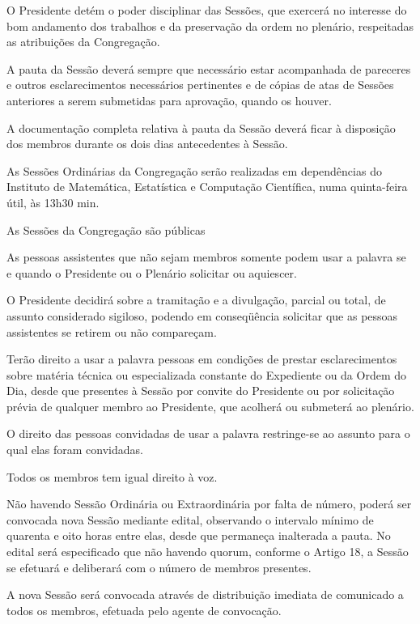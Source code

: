 \documentclass{documento}
\begin{document}
\artigo O Presidente detém o poder disciplinar das Sessões, que exercerá no interesse do bom andamento dos trabalhos e da preservação da ordem no plenário, respeitadas as atribuições da Congregação.

\artigo A pauta da Sessão deverá sempre que necessário estar acompanhada de pareceres e outros esclarecimentos necessários pertinentes e de cópias de atas de Sessões anteriores a serem submetidas para aprovação, quando os houver.

\paragrafo A documentação completa relativa à pauta da Sessão deverá ficar à disposição dos membros durante os dois dias antecedentes à Sessão.

\paragrafo As Sessões Ordinárias da Congregação serão realizadas em dependências do Instituto de Matemática, Estatística e Computação Científica, numa quinta-feira útil, às 13h30 min. 

\artigo As Sessões da Congregação são públicas

\paragrafo As pessoas assistentes que não sejam membros somente podem usar a palavra se e quando o Presidente ou o Plenário solicitar ou aquiescer.

\paragrafo O Presidente decidirá sobre a tramitação e a divulgação, parcial ou total, de assunto considerado sigiloso, podendo em conseqüência solicitar que as pessoas assistentes se retirem ou não compareçam.

\paragrafo Terão direito a usar a palavra pessoas em condições de prestar esclarecimentos sobre matéria técnica ou especializada constante do Expediente ou da Ordem do Dia, desde que presentes à Sessão por convite do Presidente ou por solicitação prévia de qualquer membro ao Presidente, que acolherá ou submeterá ao plenário.

\paragrafo O direito das pessoas convidadas de usar a palavra restringe-se ao assunto para o qual elas foram convidadas.

\paragrafo Todos os membros tem igual direito à voz.

\artigo Não havendo Sessão Ordinária ou Extraordinária por falta de número, poderá ser convocada nova Sessão mediante edital, observando o intervalo mínimo de quarenta e oito horas entre elas, desde que permaneça inalterada a pauta. No edital será especificado que não havendo quorum, conforme o Artigo 18, a Sessão se efetuará e deliberará com o número de membros presentes.

\paragrafounico A nova Sessão será convocada através de distribuição imediata de comunicado a todos os membros, efetuada pelo agente de convocação.
\end{document}
